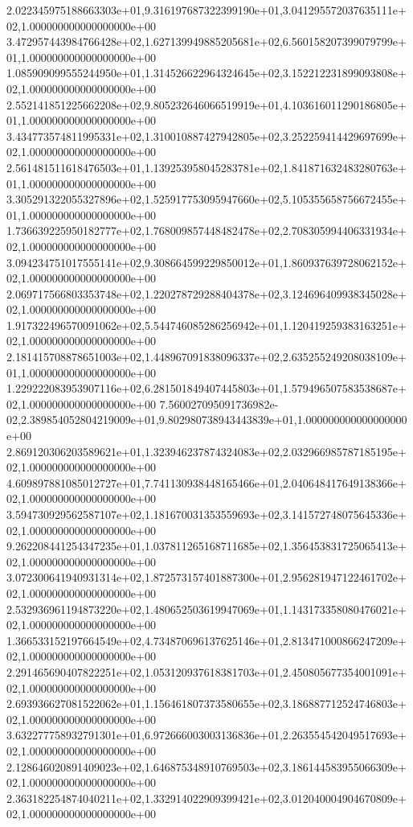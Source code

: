 2.022345975188663303e+01,9.316197687322399190e+01,3.041295572037635111e+02,1.000000000000000000e+00
3.472957443984766428e+02,1.627139949885205681e+02,6.560158207399079799e+01,1.000000000000000000e+00
1.085909099555244950e+01,1.314526622964324645e+02,3.152212231899093808e+02,1.000000000000000000e+00
2.552141851225662208e+02,9.805232646066519919e+01,4.103616011290186805e+01,1.000000000000000000e+00
3.434773574811995331e+02,1.310010887427942805e+02,3.252259414429697699e+02,1.000000000000000000e+00
2.561481511618476503e+01,1.139253958045283781e+02,1.841871632483280763e+01,1.000000000000000000e+00
3.305291322055327896e+02,1.525917753095947660e+02,5.105355658756672455e+01,1.000000000000000000e+00
1.736639225950182777e+02,1.768009857448482478e+02,2.708305994406331934e+02,1.000000000000000000e+00
3.094234751017555141e+02,9.308664599229850012e+01,1.860937639728062152e+02,1.000000000000000000e+00
2.069717566803353748e+02,1.220278729288404378e+02,3.124696409938345028e+02,1.000000000000000000e+00
1.917322496570091062e+02,5.544746085286256942e+01,1.120419259383163251e+02,1.000000000000000000e+00
2.181415708878651003e+02,1.448967091838096337e+02,2.635255249208038109e+01,1.000000000000000000e+00
1.229222083953907116e+02,6.281501849407445803e+01,1.579496507583538687e+02,1.000000000000000000e+00
7.560027095091736982e-02,2.389854052804219009e+01,9.802980738943443839e+01,1.000000000000000000e+00
2.869120306203589621e+01,1.323946237874324083e+02,2.032966985787185195e+02,1.000000000000000000e+00
4.609897881085012727e+01,7.741130938448165466e+01,2.040648417649138366e+02,1.000000000000000000e+00
3.594730929562587107e+02,1.181670031353559693e+02,3.141572748075645336e+02,1.000000000000000000e+00
9.262208441254347235e+01,1.037811265168711685e+02,1.356453831725065413e+02,1.000000000000000000e+00
3.072300641940931314e+02,1.872573157401887300e+01,2.956281947122461702e+02,1.000000000000000000e+00
2.532936961194873220e+02,1.480652503619947069e+01,1.143173358080476021e+02,1.000000000000000000e+00
1.366533152197664549e+02,4.734870696137625146e+01,2.813471000866247209e+02,1.000000000000000000e+00
2.291465690407822251e+02,1.053120937618381703e+01,2.450805677354001091e+02,1.000000000000000000e+00
2.693936627081522062e+01,1.156461807373580655e+02,3.186887712524746803e+02,1.000000000000000000e+00
3.632277758932791301e+01,6.972666003003136836e+01,2.263554542049517693e+02,1.000000000000000000e+00
2.128646020891409023e+02,1.646875348910769503e+02,3.186144583955066309e+02,1.000000000000000000e+00
2.363182254874040211e+02,1.332914022909399421e+02,3.012040004904670809e+02,1.000000000000000000e+00
